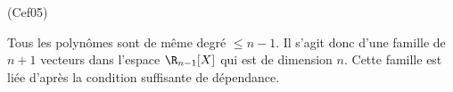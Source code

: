 \begin{tiny}(Cef05)\end{tiny} Tous les polynômes sont de même degré $\leq n-1$. Il s'agit donc d'une famille de $n+1$ vecteurs dans l'espace $\R_{n-1}[X]$ qui est de dimension $n$. Cette famille est liée d'après la condition suffisante de dépendance.